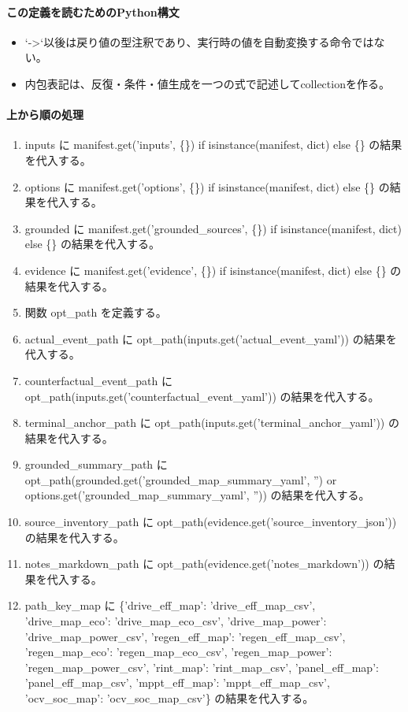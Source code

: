 \documentclass[a4paper,11pt]{article}
\begin{document}
            \paragraph{この定義を読むためのPython構文}
            \begin{itemize}[leftmargin=1.6em]
            \item `->`以後は戻り値の型注釈であり、実行時の値を自動変換する命令ではない。
\item 内包表記は、反復・条件・値生成を一つの式で記述してcollectionを作る。
            \end{itemize}
            \paragraph{上から順の処理}
            \begin{enumerate}[leftmargin=1.8em]
            \item inputs に manifest.get('inputs', \{\}) if isinstance(manifest, dict) else \{\} の結果を代入する。
\item options に manifest.get('options', \{\}) if isinstance(manifest, dict) else \{\} の結果を代入する。
\item grounded に manifest.get('grounded\_sources', \{\}) if isinstance(manifest, dict) else \{\} の結果を代入する。
\item evidence に manifest.get('evidence', \{\}) if isinstance(manifest, dict) else \{\} の結果を代入する。
\item 関数 opt\_path を定義する。
\item actual\_event\_path に opt\_path(inputs.get('actual\_event\_yaml')) の結果を代入する。
\item counterfactual\_event\_path に opt\_path(inputs.get('counterfactual\_event\_yaml')) の結果を代入する。
\item terminal\_anchor\_path に opt\_path(inputs.get('terminal\_anchor\_yaml')) の結果を代入する。
\item grounded\_summary\_path に opt\_path(grounded.get('grounded\_map\_summary\_yaml', '') or options.get('grounded\_map\_summary\_yaml', '')) の結果を代入する。
\item source\_inventory\_path に opt\_path(evidence.get('source\_inventory\_json')) の結果を代入する。
\item notes\_markdown\_path に opt\_path(evidence.get('notes\_markdown')) の結果を代入する。
\item path\_key\_map に \{'drive\_eff\_map': 'drive\_eff\_map\_csv', 'drive\_map\_eco': 'drive\_map\_eco\_csv', 'drive\_map\_power': 'drive\_map\_power\_csv', 'regen\_eff\_map': 'regen\_eff\_map\_csv', 'regen\_map\_eco': 'regen\_map\_eco\_csv', 'regen\_map\_power': 'regen\_map\_power\_csv', 'rint\_map': 'rint\_map\_csv', 'panel\_eff\_map': 'panel\_eff\_map\_csv', 'mppt\_eff\_map': 'mppt\_eff\_map\_csv', 'ocv\_soc\_map': 'ocv\_soc\_map\_csv'\} の結果を代入する。

\end{enumerate}
\end{document}
